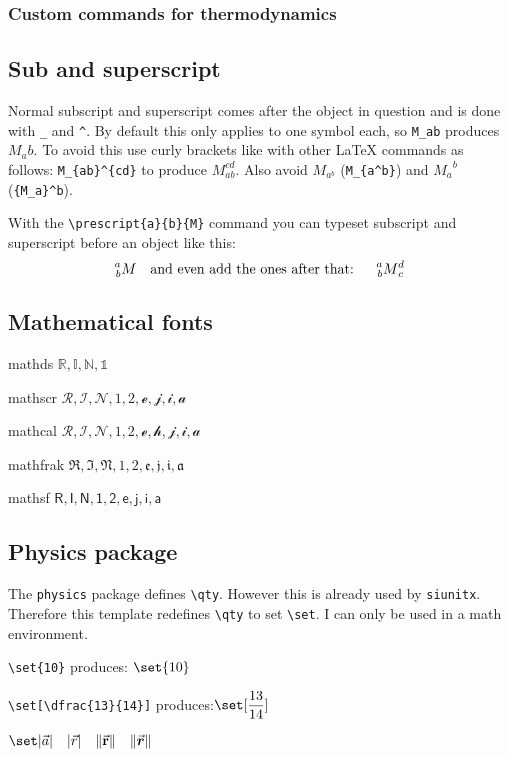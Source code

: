     \subsubsection{Custom commands for thermodynamics}


\subsection{Sub and superscript}
    Normal subscript and superscript comes after the object in question and is done with \texttt{\_} and \texttt{\^}. By default this only applies to one symbol each, so \verb|M_ab| produces $M_ab$. To avoid this use curly brackets like with other \LaTeX{} commands as follows: \verb|M_{ab}^{cd}| to produce $M_{ab}^{cd}$. Also avoid $M_{a^b}$ (\verb*|M_{a^b}|) and ${M_a}^b$ (\verb*|{M_a}^b|).

    With the \verb|\prescript{a}{b}{M}| command you can typeset subscript and superscript before an object like this:
    \[  \prescript{a}{b}{M}
        \text{\quad and even add the ones after that: \quad}
        \prescript{a}{b}{M}_c^d \]

\subsection{Mathematical fonts}

    mathds $\mathds{R, I, N, 1}$

    mathscr $\mathscr{R, I, N, 1, 2, e, j, i, a}$

    mathcal $\mathcal{R, I, N, 1, 2, e,h, j, i, a}$

    mathfrak $\mathfrak{R, I, N, 1, 2, e, j, i, a}$

    mathsf $\mathsf{R, I, N, 1, 2, e, j, i, a}$

\subsection{Physics package}

    The \verb|physics| package defines \verb|\qty|. However this is already used by \texttt{siunitx}. Therefore this template redefines \verb|\qty| to set \verb|\set|. I can only be used in a math environment.


    \verb|\set{10}| produces: $\set{10}$

    \verb|\set[\dfrac{13}{14}]|     produces:$\set[\dfrac{13}{14}]$

    $\set|\vec{a}| \quad  \abs{\vec{r}} \quad \norm{\va{r}} \quad \norm{\va*{r}} $




